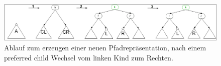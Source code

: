 \documentclass[a4paper,12pt]{article}
\begin{document}
\begin{figure}[h]
	\centering
	\includegraphics[width= 1\textwidth]{"Medien/Multisplay/split"}
	\caption {Ablauf zum erzeugen einer neuen Pfadrepräsentation, nach einem preferred child Wechsel vom linken Kind zum Rechten.}
	\label{fig:split}
\end{figure} 



\newpage


\end{document}
